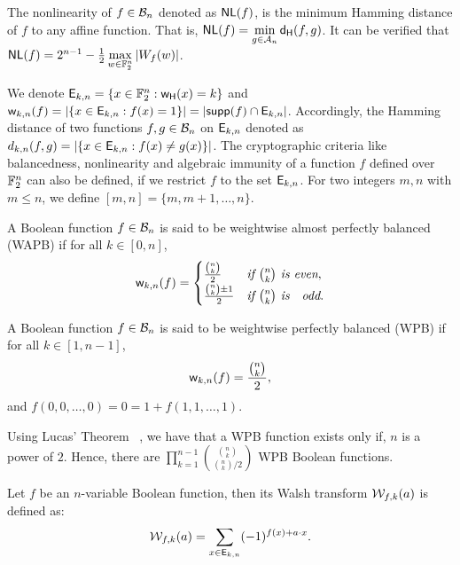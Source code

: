 \documentclass{llncs}
\begin{document}
\begin{definition}[Nonlinearity]\label{def:Nonlinearity}
The nonlinearity of $f \in \mathcal{B}_n$ denoted as $\mathsf{NL}(f)$, is the minimum Hamming distance of $f$ to any affine function. That is, $\mathsf{NL}(f) = \min\limits_{g \in \mathcal{A}_n} \mathsf{d_H}(f,g)$.
It can be verified that $\mathsf{NL}(f) = 2^{n-1} - \frac{1}{2}\max\limits_{w \in \mathbb{F}_2^n} |W_{f}(w)|$.
\end{definition}

We denote $\mathsf{E}_{k,n} = \{x \in \mathbb{F}_2^n : \mathsf{w_H}(x)=k\}$ and $\mathsf{w}_{k,n}(f) = |\{x \in \mathsf{E}_{k,n} : f(x) = 1 \}| = |\mathsf{supp}(f) \cap \mathsf{E}_{k,n}|$. Accordingly, the Hamming distance of two functions $f, g \in \mathcal{B}_n$ on $\mathsf{E}_{k,n}$ denoted as $d_{k,n}(f,g) = |\{x \in \mathsf{E}_{k,n} : f(x) \neq g(x)\}|$. The cryptographic criteria like balancedness, nonlinearity and algebraic immunity of a function $f$ defined over $\mathbb{F}_2^n$ can also be defined, if we restrict $f$ to the set $\mathsf{E}_{k,n}$. For two integers $m, n$ with $m \leq n$, we define $[m,n] = \{m, m+1, \ldots, n\}$.

\begin{definition}\label{def:WAPB}
A Boolean function $f \in \mathcal{B}_n$ is said to be weightwise almost perfectly balanced (WAPB) if for all $k \in [0,n]$, \[\mathsf{w}_{k,n}(f)=
\begin{cases}
\frac{{n\choose k}}{2} & \textit{if } {n \choose k} \textit{ is even},\\
\frac{{n \choose k}\pm 1}{2} & \textit{if } {n \choose k} \textit{ is \; odd}.
\end{cases} \]
\end{definition}

\begin{definition}\label{def:WPB}
A Boolean function $f \in \mathcal{B}_n$ is said to be weightwise perfectly balanced (WPB) if for all $k \in [1,n-1]$, 
\[\mathsf{w}_{k,n}(f) = \frac{{n \choose k}}{2},\]
and $f(0,0,\ldots,0)=0=1+f(1,1,\ldots,1)$.
\end{definition}

Using Lucas' Theorem \eg~\cite{AMM:F47}, we have that a WPB function exists only if, $n$ is a power of $2$. Hence, there are $\displaystyle {\prod_{k = 1}^{n-1} {{{n \choose k}} \choose {{n \choose k}/2}}}$ WPB Boolean functions.

\begin{definition}\label{def:restWalsh}
Let $f$ be an $n$-variable Boolean function, then its Walsh transform $\mathcal{W}_{f,k}(a)$ is defined as:
\[\mathcal{W}_{f,k}(a) = \sum_{x \in \mathsf{E}_{k,n}} (-1)^{f(x)+ a \cdot x}.\]
\end{definition}
\end{document}
